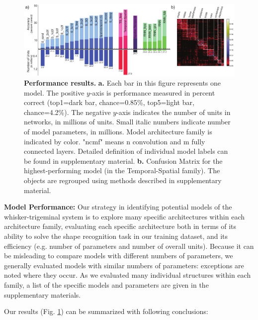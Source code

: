 \begin{figure}
\includegraphics [width=1\linewidth]{figures/results.pdf}
\vspace{-3mm}
\caption{\footnotesize{\textbf{Performance results.} \textbf{a.} Each bar in this figure represents one model. The positive $y$-axis is performance measured in percent correct (top1=dark bar, chance=0.85\%, top5=light bar, chance=4.2\%).  The negative $y$-axis indicates the number of units in networks, in millions of units.  Small italic numbers indicate number of model parameters, in millions. Model architecture family is indicated by color. "ncmf" means n convolution and m fully connected layers. Detailed definition of individual model labels can be found in supplementary material. \textbf{b.} Confusion Matrix for the highest-performing model (in the Temporal-Spatial family). The objects are regrouped using methods described in supplementary material.}~\label{fig_main}}
\vspace{-5mm}
\end{figure}

\textbf{Model Performance:}
Our strategy in identifying potential models of the whisker-trigeminal system is to explore many specific architectures within each architecture family, evaluating each specific architecture both in terms of its ability to solve the shape recognition task in our training dataset, and its efficiency (e.g. number of parameters and number of overall units).
Because it can be misleading to compare models with different numbers of parameters, we generally evaluated models with similar numbers of parameters: exceptions are noted where they occur.
As we evaluated many individual structures within each family, a list of the specific models and parameters are given in the supplementary materials.

Our results (Fig. \ref{fig_main}) can be summarized with following conclusions:

